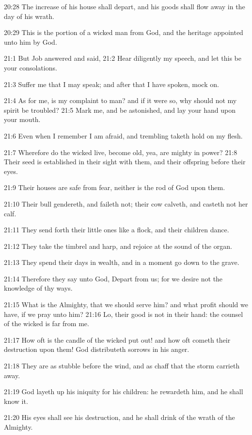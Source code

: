 20:28 The increase of his house shall depart, and his goods shall flow
away in the day of his wrath.

20:29 This is the portion of a wicked man from God, and the heritage
appointed unto him by God.

21:1 But Job answered and said, 21:2 Hear diligently my speech, and
let this be your consolations.

21:3 Suffer me that I may speak; and after that I have spoken, mock
on.

21:4 As for me, is my complaint to man? and if it were so, why should
not my spirit be troubled?  21:5 Mark me, and be astonished, and lay
your hand upon your mouth.

21:6 Even when I remember I am afraid, and trembling taketh hold on my
flesh.

21:7 Wherefore do the wicked live, become old, yea, are mighty in
power?  21:8 Their seed is established in their sight with them, and
their offspring before their eyes.

21:9 Their houses are safe from fear, neither is the rod of God upon
them.

21:10 Their bull gendereth, and faileth not; their cow calveth, and
casteth not her calf.

21:11 They send forth their little ones like a flock, and their
children dance.

21:12 They take the timbrel and harp, and rejoice at the sound of the
organ.

21:13 They spend their days in wealth, and in a moment go down to the
grave.

21:14 Therefore they say unto God, Depart from us; for we desire not
the knowledge of thy ways.

21:15 What is the Almighty, that we should serve him? and what profit
should we have, if we pray unto him?  21:16 Lo, their good is not in
their hand: the counsel of the wicked is far from me.

21:17 How oft is the candle of the wicked put out! and how oft cometh
their destruction upon them! God distributeth sorrows in his anger.

21:18 They are as stubble before the wind, and as chaff that the storm
carrieth away.

21:19 God layeth up his iniquity for his children: he rewardeth him,
and he shall know it.

21:20 His eyes shall see his destruction, and he shall drink of the
wrath of the Almighty.

